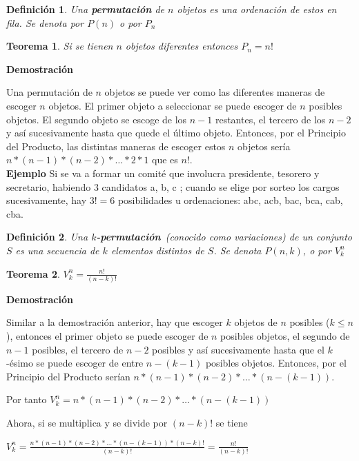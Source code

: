 \documentclass[a4paper,12pt]{report}
\newtheorem*{teo}{Teorema}
\newtheorem*{dfn}{Definición}
\begin{document}
\begin{dfn}
 Una \textbf{permutación} de $n$ objetos es una ordenación de estos en fila. Se denota por $P(n)$ o por $P_n$  
\end{dfn}

\begin{teo}
 Si se tienen $n$ objetos diferentes entonces $P_n = n!$
\end{teo}

\textbf{Demostración}

Una permutación de $n$ objetos se puede ver como las diferentes maneras de escoger $n$ objetos. El primer objeto a seleccionar se puede escoger de $n$  posibles objetos. El segundo objeto se escoge de los $n-1$ restantes, el tercero de los $n-2$ y así sucesivamente hasta que quede el último objeto. Entonces, por el Principio del Producto, las distintas maneras de escoger estos $n$ objetos sería $n*(n-1)*(n-2)*\dots *2*1$ que es $n!$.\\

\textbf{Ejemplo}
 Si se va a formar un comité que involucra presidente, tesorero y secretario, habiendo 3 candidatos a, b, c ; cuando se elige por sorteo los cargos sucesivamente, hay $3!=6$ posibilidades u ordenaciones: abc, acb, bac, bca, cab, cba.

\begin{dfn}
 Una \textbf{$k$-permutación}~(conocido como variaciones) de un conjunto $S$ es una secuencia de $k$ elementos distintos de $S$. Se denota $P(n,k)$, o por $V^n_k$ 
\end{dfn}

\begin{teo}
 $V^n_k=\frac{n!}{(n-k)!}$
\end{teo}

\textbf{Demostración}

Similar a la demostración anterior, hay que escoger $k$ objetos de $n$ posibles ($k\leq n$), entonces el primer objeto se puede escoger de $n$ posibles objetos, el segundo de $n-1$ posibles, el tercero de $n-2$ posibles y así sucesivamente hasta que el $k$-ésimo se puede escoger de entre $n-(k-1)$ posibles objetos. Entonces, por el Principio del Producto serían $n*(n-1)*(n-2)*\dots *(n-(k-1))$.  

Por tanto $V^n_k=n*(n-1)*(n-2)*\dots *(n-(k-1))$

Ahora, si se multiplica y se divide por $(n-k)!$ se tiene

$V^n_k=\frac{n*(n-1)*(n-2)*\dots *(n-(k-1))*(n-k)!}{(n-k)!}=\frac{n!}{(n-k)!}$\\
\end{document}
